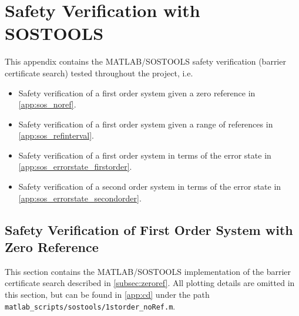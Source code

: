 \section{Safety Verification with SOSTOOLS}
This appendix contains the MATLAB/SOSTOOLS safety verification (barrier certificate search) tested throughout the project, i.e.
\begin{itemize}
\item Safety verification of a first order system given a zero reference in \autoref{app:sos_noref}.
\item Safety verification of a first order system given a range of references in \autoref{app:sos_refinterval}.
\item Safety verification of a first order system in terms of the error state in \autoref{app:sos_errorstate_firstorder}.
\item Safety verification of a second order system in terms of the error state in \autoref{app:sos_errorstate_secondorder}.
\end{itemize}

\subsection{Safety Verification of First Order System with Zero Reference}\label{app:sos_noref}
This section contains the MATLAB/SOSTOOLS implementation of the barrier certificate search described in \autoref{subsec:zeroref}. All plotting details are omitted in this section, but can be found in \autoref{app:cd} under the path \texttt{matlab\_scripts/sostools/1storder\_noRef.m}.

